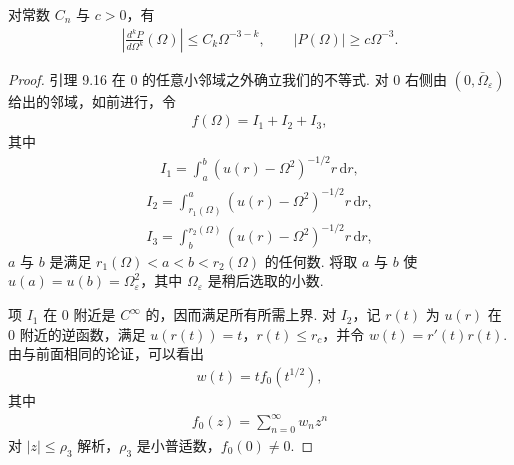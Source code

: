 \begin{lemma}\label{lem:9.17}
对常数 $C_{n}$ 与 $c > 0$，有
\begin{align*}
  \left|\frac{d^{k}P}{d\Omega^{k}}(\Omega)\right|\leq C_{k}\Omega^{-3-k},\qquad
  |P(\Omega)|\geq c\Omega^{-3}.
\end{align*}
\end{lemma}

\begin{proof}
引理 9.16 在 $0$ 的任意小邻域之外确立我们的不等式. 对 $0$ 右侧由 $(0, \bar{\Omega}_{\varepsilon})$ 给出的邻域，如前进行，令
\begin{align*}
  f(\Omega)=I_{1}+I_{2}+I_{3},
\end{align*}
其中
\begin{align*}
  I_{1}=\int_{a}^{b}\left(u(r)-\Omega^{2}\right)^{-1/2}r\,\mathrm{d}r,
\end{align*}
\begin{align*}
  I_{2}=\int_{r_{1}(\Omega)}^{a}\left(u(r)-\Omega^{2}\right)^{-1/2}r\,\mathrm{d}r,
\end{align*}
\begin{align*}
  I_{3}=\int_{b}^{r_{2}(\Omega)}\left(u(r)-\Omega^{2}\right)^{-1/2}r\,\mathrm{d}r,
\end{align*}
$a$ 与 $b$ 是满足 $r_1(\Omega) < a < b < r_2(\Omega)$ 的任何数. 将取 $a$ 与 $b$ 使 $u(a) = u(b) = \Omega_\varepsilon^2$，其中 $\Omega_\varepsilon$ 是稍后选取的小数.

项 $I_1$ 在 $0$ 附近是 $C^\infty$ 的，因而满足所有所需上界. 对 $I_2$，记 $r(t)$ 为 $u(r)$ 在 $0$ 附近的逆函数，满足 $u(r(t)) = t$，$r(t) \leq r_c$，并令 $w(t) = r'(t)r(t)$. 由与前面相同的论证，可以看出
\begin{align*}
  w(t)=t f_{0}(t^{1/2}),
\end{align*}
其中
\begin{align*}
  f_{0}(z)=\sum_{n=0}^{\infty}w_{n}z^{n}
\end{align*}
对 $|z| \leq \rho_3$ 解析，$\rho_3$ 是小普适数，$f_0(0) \neq 0$.


\end{proof}
